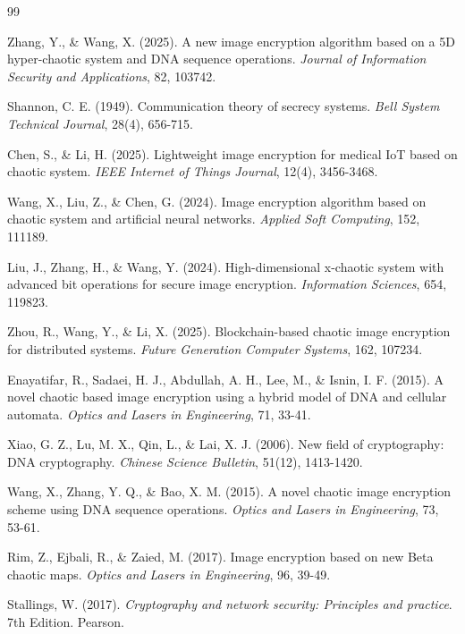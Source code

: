 \documentclass[a4paper,12pt]{report}
\renewcommand{\%}{\lr{\oldpercent}}
\begin{document}
\begin{thebibliography}{99}
\begin{LTRbibitems}
\begin{latin}
 Zhang, Y., \& Wang, X. (2025). A new image encryption algorithm based on a 5D hyper-chaotic system and DNA sequence operations. \textit{Journal of Information Security and Applications}, 82, 103742.

 Shannon, C. E. (1949). Communication theory of secrecy systems. \textit{Bell System Technical Journal}, 28(4), 656-715.

 Chen, S., \& Li, H. (2025). Lightweight image encryption for medical IoT based on chaotic system. \textit{IEEE Internet of Things Journal}, 12(4), 3456-3468.

 Wang, X., Liu, Z., \& Chen, G. (2024). Image encryption algorithm based on chaotic system and artificial neural networks. \textit{Applied Soft Computing}, 152, 111189.

 Liu, J., Zhang, H., \& Wang, Y. (2024). High-dimensional x-chaotic system with advanced bit operations for secure image encryption. \textit{Information Sciences}, 654, 119823.

 Zhou, R., Wang, Y., \& Li, X. (2025). Blockchain-based chaotic image encryption for distributed systems. \textit{Future Generation Computer Systems}, 162, 107234.

 Enayatifar, R., Sadaei, H. J., Abdullah, A. H., Lee, M., \& Isnin, I. F. (2015). A novel chaotic based image encryption using a hybrid model of DNA and cellular automata. \textit{Optics and Lasers in Engineering}, 71, 33-41.

 Xiao, G. Z., Lu, M. X., Qin, L., \& Lai, X. J. (2006). New field of cryptography: DNA cryptography. \textit{Chinese Science Bulletin}, 51(12), 1413-1420.

 Wang, X., Zhang, Y. Q., \& Bao, X. M. (2015). A novel chaotic image encryption scheme using DNA sequence operations. \textit{Optics and Lasers in Engineering}, 73, 53-61.

 Rim, Z., Ejbali, R., \& Zaied, M. (2017). Image encryption based on new Beta chaotic maps. \textit{Optics and Lasers in Engineering}, 96, 39-49.

 Stallings, W. (2017). \textit{Cryptography and network security: Principles and practice}. 7th Edition. Pearson.
\end{latin}
\end{LTRbibitems}

\end{thebibliography}
\end{document}
